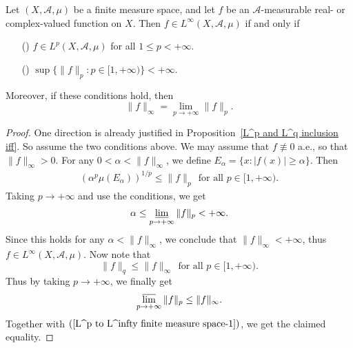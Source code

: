 \begin{proposition}\label{L^p to L^infty finite measure space}
Let $(X,\mathcal{A},\mu)$ be a finite measure space, and let $f$ be an $\mathcal{A}$-measurable real- or complex-valued function on $X$. Then $f\in L^\infty(X,\mathcal{A},\mu)$ if and only if
\begin{itemize}
\item[(\rmnum{1})] $f\in L^p(X,\mathcal{A},\mu)$ for all $1\leq p<+\infty$.
\item[(\rmnum{2})] $\sup\{\|f\|_p:p\in[1,+\infty)\}<+\infty$.
\end{itemize}
Moreover, if these conditions hold, then
\[\|f\|_{\infty}=\lim_{p\to+\infty}\|f\|_p.\]
\end{proposition}
\begin{proof}
One direction is already justified in Proposition~\ref{L^p and L^q inclusion iff}. So assume the two conditions above. We may assume that $f\not\equiv 0$ a.e., so that $\|f\|_\infty>0$. For any $0<\alpha<\|f\|_\infty$, we define $E_\alpha=\{x:|f(x)|\geq\alpha\}$. Then
\begin{align*}
(\alpha^p\mu(E_\alpha))^{1/p}\leq\|f\|_p\ \ \text{for all $p\in[1,+\infty)$}.
\end{align*}
Taking $p\to+\infty$ and use the conditions, we get
\begin{align}\label{L^p to L^infty finite measure space-1}
\alpha\leq\varliminf_{p\to+\infty}\|f\|_p<+\infty.
\end{align}
Since this holds for any $\alpha<\|f\|_\infty$, we conclude that $\|f\|_\infty<+\infty$, thus $f\in L^\infty(X,\mathcal{A},\mu)$. Now note that
\[\|f\|_q\leq\|f\|_\infty\ \ \text{for all $p\in[1,+\infty)$}.\]
Thus by taking $p\to+\infty$, we finally get
\[\varlimsup_{p\to+\infty}\|f\|_p\leq\|f\|_\infty.\]
Together with $(\ref{L^p to L^infty finite measure space-1})$, we get the claimed equality.
\end{proof}
